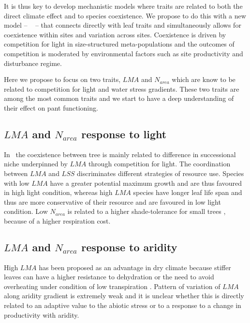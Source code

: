 \documentclass[a4paper,11pt]{article}
\begin{document}
It is thus key to develop mechanistic models where traits are related
to both the direct climate effect and to species coexistence. We propose to do this with a new model -- \plant\
\citep{Falster-2016,Falster-2017} -- that connects directly with leaf
traits and simultaneously allows for coexistence within sites and
variation across sites. Coexistence is driven by competition for light
in size-structured meta-populations and the outcomes of competition is
moderated by environmental factors such as site productivity and disturbance regime.

Here we propose to focus on two traits, $LMA$ and $N_{area}$ which are know to be related to competition for light and water stress gradients. These two traits are among the most common traits and we start to have a deep understanding of their effect on pant functioning. 

\subsection{$LMA$ and $N_{area}$ response to light}
 In \plant\ the coexistence between tree is mainly related to difference in successional niche underpinned by $LMA$ through competition for light. The coordination between $LMA$ and $LSS$ discriminates different strategies of resource use. Species with low $LMA$ have a greater potential maximum growth and are thus favoured in high light condition, whereas high $LMA$ species have longer leaf life span and thus are more conservative of their resource and are favoured in low light condition. Low $N_{area}$ is related to a higher shade-tolerance for small trees \citep{Falster-2018}, because of a higher respiration cost.


 
\subsection{$LMA$ and $N_{area}$ response to aridity}

High $LMA$ has been proposed as an advantage in dry climate because
stiffer leaves can have a higher resistance to dehydration
\citep{Wright-2002a,Wright-2002b} or the need to avoid overheating
under condition of low transpiration \citep{Leigh-2012}.
Pattern of variation of $LMA$ along aridity gradient is extremely weak and it is unclear whether this is directly related to an adaptive value to the abiotic stress or to a response to a change in productivity with aridity.
 
\end{document}
